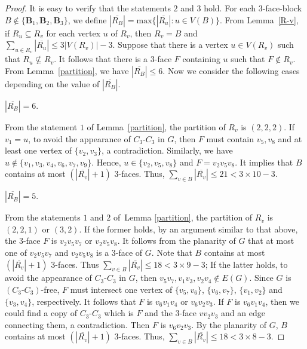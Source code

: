 \documentclass[10pt,a4paper]{amsart}
\begin{document}
\begin{proof}
    It is easy to verify that the statements $2$ and $3$ hold. For each $3$-face-block $B\notin\{\mathbf{B}_1,\mathbf{B}_2,\mathbf{B}_3\}$, we define $|\overline{R_B}|=\mbox{max}\{|\overline{R_u}|:u\in V(B)\}$. From Lemma~\ref{R-v}, if $R_u\subseteq R_v$ for each vertex $u$ of $R_v$, then $R_v=B$ and $\sum_{u \in R_v}|\overline{R_u}| \leq 3|V(R_v)|-3$. 
    Suppose that there is a vertex $u\in V(R_v)$ such that $R_u\not\subseteq R_v$. It follows that there is a $3$-face $F$ containing $u$ such that $F\notin R_v$. From Lemma~\ref{partition}, we have $|\overline{R_B}|\leq 6$. Now we consider the following cases depending on the value of $|\overline{R_B}|$.

    \begin{case} 
        $|\overline{R_B}|=6$.
    \end{case}
    
    From the statement $1$ of Lemma~\ref{partition}, the partition of $R_v$ is $(2,2,2)$. If $v_1=u$, to avoid the appearance of $C_3\textbf{-}C_3$ in $G$, then $F$ must contain $v_5, v_8$ and at least one vertex of $\{v_2,v_3\}$, a contradiction. Similarly, we have $u\notin\{v_1,v_3,v_4,v_6,v_7,v_9\}$. Hence, $u\in\{v_2,v_5,v_8\}$ and $F=v_2v_5v_8$. It implies that $B$ contains at most $(|\overline{R_v}|+1)$ $3$-faces. Thus, $\sum_{v\in B}|\overline{R_v}| \leq 21 < 3\times10-3$. 
    
    \begin{case} 
        $|\overline{R_B}|=5$.
    \end{case}
    
    From the statements $1$ and $2$ of~Lemma \ref{partition}, the partition of $R_v$ is $(2,2,1)$ or $(3,2)$.
    If the former holds, by an argument similar to that above, the $3$-face $F$ is $v_2v_5v_7$ or $v_2v_5v_8$. It follows from the planarity of $G$ that at most one of $v_2v_5v_7$ and $v_2v_5v_8$ is a $3$-face of $G$. Note that $B$ contains at most $(|\overline{R_v}|+1)$ $3$-faces. Thus $\sum_{v \in B}|\overline{R_v}| \leq 18 < 3\times9-3$; 
    If the latter holds, to avoid the appearance of $C_3\textbf{-}C_3$ in $G$, then $v_5v_7, v_1v_3, v_2v_4 \notin E(G)$. Since $G$ is $(C_3\textbf{-}C_3)$-free, $F$ must intersect one vertex of $\{v_5,v_6\}$, $\{v_6,v_7\}$, $\{v_1,v_2\}$ and $\{v_3,v_4\}$, respectively. It follows that $F$ is $v_6v_1v_4$ or $v_6v_2v_3$. If $F$ is $v_6v_1v_4$, then we could find a copy of $C_3\textbf{-}C_3$ which is $F$ and the $3$-face $vv_2v_3$ and an edge connecting them, a contradiction. Then $F$ is $v_6v_2v_3$. By the planarity of $G$, $B$ contains at most $(|\overline{R_v}|+1)$ $3$-faces. Thus, $\sum_{v \in B}|\overline{R_v}| \leq 18 < 3\times8-3$.


\end{proof}
\end{document}
